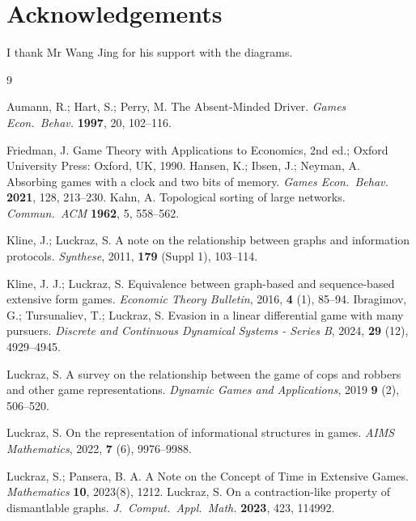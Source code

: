 \documentclass[11pt]{article}
\begin{document}
\section*{Acknowledgements}
I thank Mr Wang Jing for his support with the diagrams.

\begin{thebibliography}{9}




Aumann, R.; Hart, S.; Perry, M.
\newblock The Absent‑Minded Driver.
\newblock \textit{Games Econ.\ Behav.} \textbf{1997}, 20, 102--116.



Friedman, J.
\newblock Game Theory with Applications to Economics, 2nd ed.; Oxford University Press: Oxford, UK, 1990.
Hansen, K.; Ibsen, J.; Neyman, A.
\newblock Absorbing games with a clock and two bits of memory.
\newblock \textit{Games Econ.\ Behav.} \textbf{2021}, 128, 213--230.
Kahn, A.
\newblock Topological sorting of large networks.
\newblock \textit{Commun.\ ACM} \textbf{1962}, 5, 558--562.


Kline, J.; Luckraz, S.
\newblock A note on the relationship between graphs and information protocols.
\newblock \textit{Synthese}, 2011, \textbf{179} (Suppl 1), 103--114.

Kline, J. J.; Luckraz, S.
\newblock Equivalence between graph-based and sequence-based extensive form games.
\newblock \textit{Economic Theory Bulletin}, 2016, \textbf{4} (1), 85--94.
Ibragimov, G.; Tursunaliev, T.; Luckraz, S.
\newblock Evasion in a linear differential game with many pursuers.
\newblock \textit{Discrete and Continuous Dynamical Systems - Series B}, 2024, \textbf{29} (12), 4929--4945.

Luckraz, S.
\newblock A survey on the relationship between the game of cops and robbers and other game representations.
\newblock \textit{Dynamic Games and Applications}, 2019 \textbf{9} (2), 506--520.

Luckraz, S.
\newblock On the representation of informational structures in games.
\newblock \textit{AIMS Mathematics}, 2022, \textbf{7} (6), 9976--9988.

Luckraz, S.; Pansera, B. A.
\newblock A Note on the Concept of Time in Extensive Games.
\newblock \textit{Mathematics} \textbf{10}, 2023(8), 1212.
Luckraz, S.
\newblock On a contraction-like property of dismantlable graphs.
\newblock \textit{J.\ Comput.\ Appl.\ Math.} \textbf{2023}, 423, 114992.






\end{thebibliography}
\end{document}
